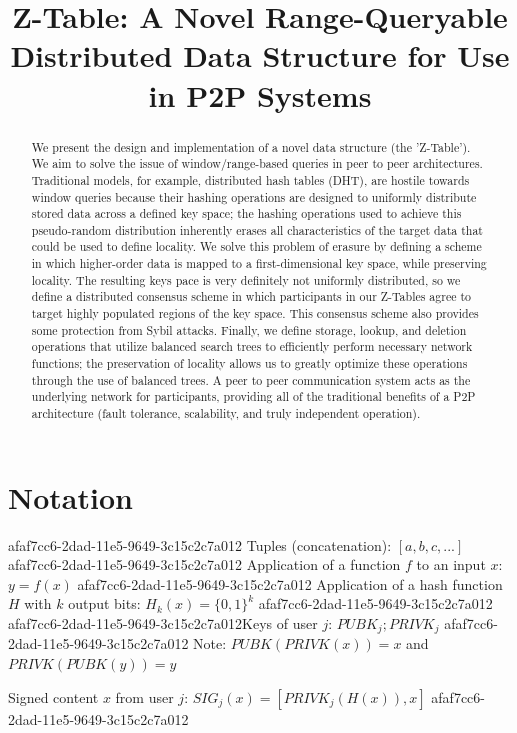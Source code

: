 \documentclass[12pt]{article}
\title{Z-Table: A Novel Range-Queryable Distributed Data Structure for Use in P2P Systems}
\begin{document}
\maketitle

\begin{abstract}
We present the design and implementation of a novel data structure (the 'Z-Table'). We aim to solve the issue of window/range-based queries in peer to peer architectures. Traditional models, for example,  distributed hash tables (DHT), are hostile towards window queries because their hashing operations are designed to uniformly distribute stored data across a defined key space; the hashing operations used to achieve this pseudo-random distribution inherently erases all characteristics of the target data that could be used to define locality. We solve this problem of erasure by defining a scheme in which higher-order data is mapped to a first-dimensional key space, while preserving locality. The resulting keys pace is very definitely not uniformly distributed, so we define a distributed consensus scheme in which participants in our Z-Tables agree to target highly populated regions of the key space. This consensus scheme also provides some protection from Sybil attacks. Finally, we define storage, lookup, and deletion operations that utilize balanced search trees to efficiently perform necessary network functions; the preservation of locality allows us to greatly optimize these operations through the use of balanced trees. A peer to peer communication system acts as the underlying network for participants, providing all of the traditional benefits of a P2P architecture (fault tolerance, scalability, and truly independent operation).
\end{abstract}

\section{Notation}
afaf7cc6-2dad-11e5-9649-3c15c2c7a012
Tuples (concatenation): $[a,b,c,...]$
afaf7cc6-2dad-11e5-9649-3c15c2c7a012
Application of a function $f$ to an input $x$: $y=f(x)$
afaf7cc6-2dad-11e5-9649-3c15c2c7a012
Application of a hash function $H$ with $k$ output bits: $H_{k}(x) = \{0,1\}^k$
afaf7cc6-2dad-11e5-9649-3c15c2c7a012
afaf7cc6-2dad-11e5-9649-3c15c2c7a012Keys of user $j$: $ PUBK_j; PRIVK_j $
afaf7cc6-2dad-11e5-9649-3c15c2c7a012
Note: $PUBK(PRIVK(x)) = x$ and $PRIVK(PUBK(y)) = y$~

Signed content $x$ from user $j$: $SIG_j(x) = \left[ PRIVK_j( H(x) ), x \right]$
afaf7cc6-2dad-11e5-9649-3c15c2c7a012
\end{document}
